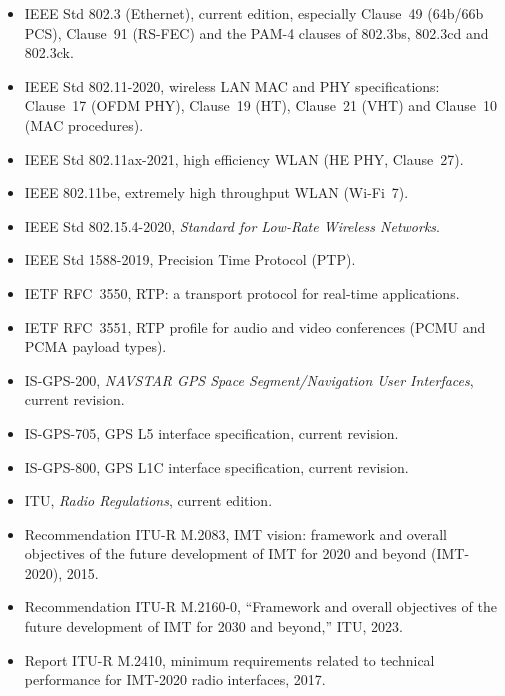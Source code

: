 \begin{itemize}[leftmargin=1.5em,itemindent=-1.5em,itemsep=1.5pt plus 1pt,parsep=0pt,topsep=4pt,label={}]
\item IEEE Std 802.3 (Ethernet), current edition, especially Clause~49 (64b/66b PCS), Clause~91 (RS-FEC) and the PAM-4 clauses of 802.3bs, 802.3cd and 802.3ck.
\item IEEE Std 802.11-2020, wireless LAN MAC and PHY specifications: Clause~17 (OFDM PHY), Clause~19 (HT), Clause~21 (VHT) and Clause~10 (MAC procedures).
\item IEEE Std 802.11ax-2021, high efficiency WLAN (HE PHY, Clause~27).
\item IEEE 802.11be, extremely high throughput WLAN (Wi-Fi~7).
\item IEEE Std 802.15.4-2020, \emph{Standard for Low-Rate Wireless Networks}.
\item IEEE Std 1588-2019, Precision Time Protocol (PTP).
\item IETF RFC~3550, RTP: a transport protocol for real-time applications.
\item IETF RFC~3551, RTP profile for audio and video conferences (PCMU and PCMA payload types).
\item IS-GPS-200, \emph{NAVSTAR GPS Space Segment/Navigation User Interfaces}, current revision.
\item IS-GPS-705, GPS L5 interface specification, current revision.
\item IS-GPS-800, GPS L1C interface specification, current revision.
\item ITU, \emph{Radio Regulations}, current edition.
\item Recommendation ITU-R M.2083, IMT vision: framework and overall objectives of the future development of IMT for 2020 and beyond (IMT-2020), 2015.
\item Recommendation ITU-R M.2160-0, ``Framework and overall objectives of the future development of IMT for 2030 and beyond,'' ITU, 2023.
\item Report ITU-R M.2410, minimum requirements related to technical performance for IMT-2020 radio interfaces, 2017.

\end{itemize}
